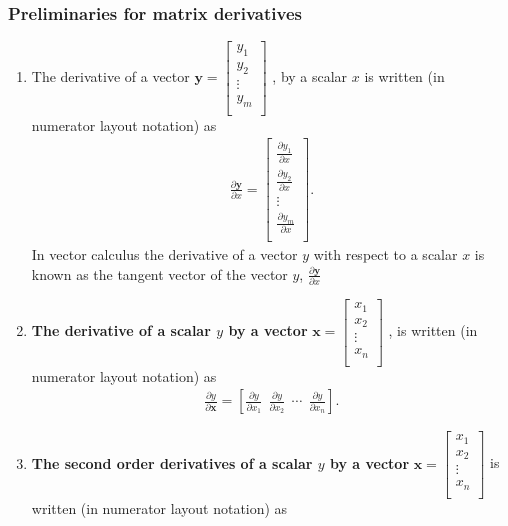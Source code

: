 \documentclass[10pt]{beamer}
\begin{document}
\begin{frame}[allowframebreaks]
  \frametitle{Preliminaries for matrix derivatives}

  \begin{enumerate}
  \item The derivative of a vector $\mathbf{y} = \begin{bmatrix} y_1 \\ y_2 \\ \vdots \\ y_m \\ \end{bmatrix}$ , by a scalar $x$ is written (in numerator layout notation) as
    \begin{align*}
      \frac{\partial \mathbf{y}}{\partial x} = \begin{bmatrix} \frac{\partial y_1}{\partial x}\\ \frac{\partial y_2}{\partial x}\\ \vdots\\ \frac{\partial y_m}{\partial x}\\ \end{bmatrix}.
    \end{align*}
    In vector calculus the derivative of a vector $y$ with respect to a scalar $x$ is known as the tangent vector of the vector $y$, $\frac{\partial \mathbf{y}}{\partial x}$

  \item \textbf{The derivative of a scalar $y$ by a vector} $\mathbf{x} = \begin{bmatrix} x_1 \\ x_2 \\ \vdots \\ x_n \\ \end{bmatrix}$ , is written (in numerator layout notation) as
    \begin{align*}
      \frac{\partial y}{\partial \mathbf{x}} = \left[ \frac{\partial y}{\partial x_1} \ \ \frac{\partial y}{\partial x_2} \ \ \cdots \ \ \frac{\partial y}{\partial x_n} \right].
    \end{align*}

  \item \textbf{The second order derivatives of a scalar $y$ by a vector} $\mathbf{x}
    = \begin{bmatrix} x_1 \\ x_2 \\ \vdots \\ x_n \\ \end{bmatrix}$ is written (in numerator layout notation) as


\end{enumerate}
\end{frame}
\end{document}
